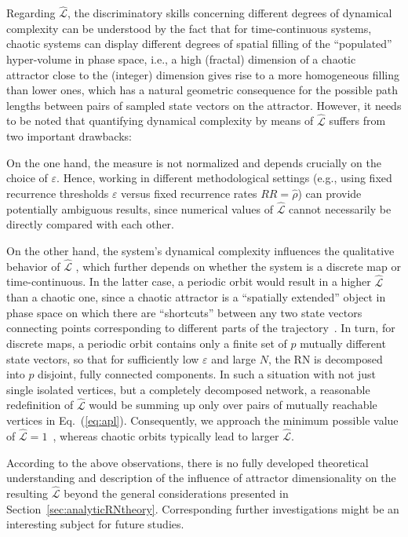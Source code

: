		Regarding $\hat{\mathcal{L}}$, the discriminatory skills concerning different degrees of dynamical complexity can be understood by the fact that for time-continuous systems, chaotic systems can display different degrees of spatial filling of the ``populated'' hyper-volume in phase space, i.e., a high (fractal) dimension of a chaotic attractor close to the (integer) dimension gives rise to a more homogeneous filling than lower ones, which has a natural geometric consequence for the possible path lengths between pairs of sampled state vectors on the attractor. However, it needs to be noted that quantifying dynamical complexity by means of $\hat{\mathcal{L}}$ suffers from two important drawbacks:

		On the one hand, the measure is not normalized and depends crucially on the choice of $\varepsilon$. Hence, working in different methodological settings (e.g., using fixed recurrence thresholds $\varepsilon$ versus fixed recurrence rates $RR=\hat{\rho}$) can provide potentially ambiguous results, since numerical values of $\hat{\mathcal{L}}$ cannot necessarily be directly compared with each other.

		On the other hand, the system's dynamical complexity influences the qualitative behavior of $\hat{\mathcal{L}}$ , which further depends on whether the system is a discrete map or time-continuous. In the latter case, a periodic orbit would result in a higher $\hat{\mathcal{L}}$ than a chaotic one, since a chaotic attractor is a ``spatially extended'' object in phase space on which there are ``shortcuts'' between any two state vectors connecting points corresponding to different parts of the trajectory~\cite{Donner2010a}. In turn, for discrete maps, a periodic orbit contains only a finite set of $p$ mutually different state vectors, so that for sufficiently low $\varepsilon$ and large $N$, the RN is decomposed into $p$ disjoint, fully connected components. In such a situation with not just single isolated vertices, but a completely decomposed network, a reasonable redefinition of $\hat{\mathcal{L}}$ would be summing up only over pairs of mutually reachable vertices in Eq.~(\ref{eq:apl}). Consequently, we approach the minimum possible value of $\hat{\mathcal{L}}=1$~\cite{Marwan2009}, whereas chaotic orbits typically lead to larger $\hat{\mathcal{L}}$.

		According to the above observations, there is no fully developed theoretical understanding and description of the influence of attractor dimensionality on the resulting $\hat{\mathcal{L}}$ beyond the general considerations presented in Section~\ref{sec:analyticRNtheory}. Corresponding further investigations might be an interesting subject for future studies.

